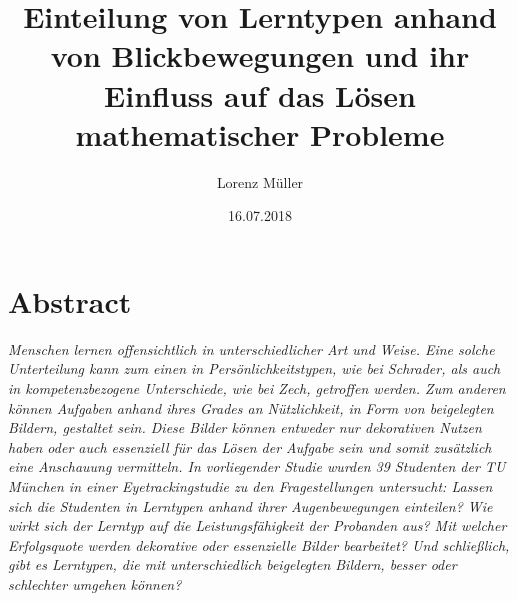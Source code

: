 %
% 
% 
%



\renewcommand{\Thema}{%
    Einteilung von Lerntypen anhand von Blickbewegungen und ihr Einfluss auf das Lösen 
    mathematischer Probleme}






\title{Einteilung von Lerntypen anhand von Blickbewegungen und ihr Einfluss auf das Lösen 
        mathematischer Probleme}
\author{Lorenz Müller}
\date{16.07.2018}


\section*{Abstract}

\textit{Menschen lernen offensichtlich in unterschiedlicher Art und Weise. Eine solche Unterteilung kann zum einen in Persönlichkeitstypen, wie bei Schrader, als auch in kompetenzbezogene Unterschiede, wie bei Zech, getroffen werden. Zum anderen können Aufgaben anhand ihres Grades an Nützlichkeit, in Form von beigelegten Bildern, gestaltet sein. Diese Bilder können entweder nur dekorativen Nutzen haben oder auch essenziell für das Lösen der Aufgabe sein und somit zusätzlich eine Anschauung vermitteln. In vorliegender Studie wurden 39 Studenten der TU München in einer Eyetrackingstudie zu den Fragestellungen untersucht: Lassen sich die Studenten in Lerntypen anhand ihrer Augenbewegungen einteilen? Wie wirkt sich der Lerntyp auf die Leistungsfähigkeit der Probanden aus? Mit welcher Erfolgsquote werden dekorative oder essenzielle Bilder bearbeitet? Und schließlich, gibt es Lerntypen, die mit unterschiedlich beigelegten Bildern, besser oder schlechter umgehen können?}

